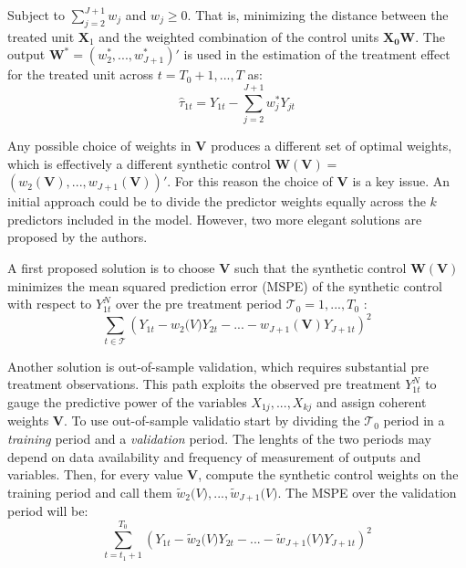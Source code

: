 \documentclass[12pt,a4paper,draft]{article}
\begin{document}
Subject to $\sum_{j=2}^{J+1}w_j$ and $w_j \geq 0$. That is, minimizing the distance 
between the treated unit $\mathbf{X}_1$ and the weighted combination of the 
control units $\mathbf{X_0} \mathbf{W}$. The output $\mathbf{W}^*=
\left( w_2^*,...,w_{J+1}^*\right) '$ is used in the estimation of the treatment 
effect for the treated unit across $t=T_0+1,...,T$ as:
\begin{equation}
    \hat{\tau}_{1t} = Y_{1t} - \sum_{j=2}^{J+1}{w^*_j Y_{jt}}
\end{equation}


Any possible choice of weights in $\mathbf{V}$ produces a different set of optimal 
weights, which is effectively a different synthetic control 
$\mathbf{W}(\mathbf{V})=$ \newline $\left(w_2(\mathbf{V}),...,w_{J+1}(\mathbf{V})\right)'$.
For this reason the choice of $\mathbf{V}$ is a key issue. An initial approach could 
be to divide the predictor weights equally across the $k$ predictors included in the 
model. However, two more elegant solutions are proposed by the authors.


A first proposed solution is to choose $\mathbf{V}$ such that the synthetic control 
$\mathbf{W}(\mathbf{V})$ minimizes the mean squared prediction error (MSPE) of 
the synthetic control with respect to $Y_{1t}^N$ over the pre treatment period
$\mathcal{T}_0 = 1,..., T_0$ : 
\begin{equation}
    \sum_{t\in\mathcal{T}} {\left(
    Y_{1t}-w_2\mathbf(V)Y_{2t}-...-w_{J+1}(\mathbf{V})Y_{J+1t}
\right)} ^2
\end{equation}


Another solution is out-of-sample validation, which requires substantial pre 
treatment observations. This path exploits the observed pre treatment $Y_{1t}^N$
to gauge the predictive power of the variables $X_{1j},...,X_{kj}$ and assign 
coherent weights $\mathbf{V}$. To use out-of-sample validatio start by 
dividing the $\mathcal{T}_0$ period in a \emph{training} period and a 
\emph{validation} period. The lenghts of the two periods may depend on data 
availability and frequency of measurement of outputs and variables. Then, for 
every value $\mathbf{V}$, compute the synthetic control weights on the training 
period and call them $\tilde{w}_2 \mathbf(V), ..., \tilde{w}_{J+1} \mathbf(V)$.
The MSPE over the validation period will be:
\begin{equation}
    \sum_{t=t_1+1}^{T_0} \left(
    Y_{1t}-\tilde{w}_2 \mathbf(V) Y_{2t} - ... - 
    \tilde{w}_{J+1} \mathbf(V) Y_{J+1t} \right)^2
\end{equation}
\end{document}
